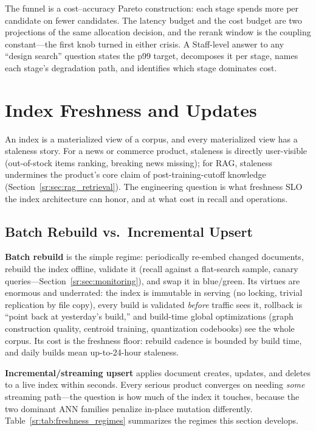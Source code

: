 \begin{keyinsight}
The funnel is a cost--accuracy Pareto construction: each stage spends more per candidate on fewer candidates. The latency budget and the cost budget are two projections of the same allocation decision, and the rerank window is the coupling constant---the first knob turned in either crisis. A Staff-level answer to any ``design search'' question states the p99 target, decomposes it per stage, names each stage's degradation path, and identifies which stage dominates cost.
\end{keyinsight}

\section{Index Freshness and Updates}
\label{sr:sec:index_freshness}

An index is a materialized view of a corpus, and every materialized view has a staleness story. For a news or commerce product, staleness is directly user-visible (out-of-stock items ranking, breaking news missing); for RAG, staleness undermines the product's core claim of post-training-cutoff knowledge (Section~\ref{sr:sec:rag_retrieval}). The engineering question is what freshness SLO the index architecture can honor, and at what cost in recall and operations.

\subsection{Batch Rebuild vs.\ Incremental Upsert}

\textbf{Batch rebuild} is the simple regime: periodically re-embed changed documents, rebuild the index offline, validate it (recall against a flat-search sample, canary queries---Section~\ref{sr:sec:monitoring}), and swap it in blue/green. Its virtues are enormous and underrated: the index is immutable in serving (no locking, trivial replication by file copy), every build is validated \textit{before} traffic sees it, rollback is ``point back at yesterday's build,'' and build-time global optimizations (graph construction quality, centroid training, quantization codebooks) see the whole corpus. Its cost is the freshness floor: rebuild cadence is bounded by build time, and daily builds mean up-to-24-hour staleness.

\textbf{Incremental/streaming upsert} applies document creates, updates, and deletes to a live index within seconds. Every serious product converges on needing \textit{some} streaming path---the question is how much of the index it touches, because the two dominant ANN families penalize in-place mutation differently. Table~\ref{sr:tab:freshness_regimes} summarizes the regimes this section develops.


